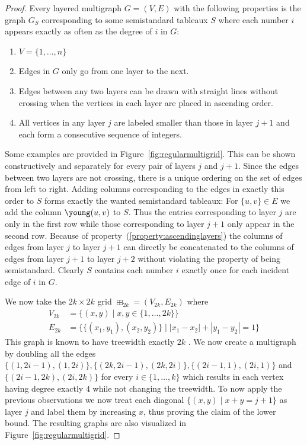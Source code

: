 \documentclass[10pt,a4paper]{article}
\numberwithin{equation}{section}
\theoremstyle{definition}
\begin{document}
\begin{proof}
    Every layered multigraph $G = (V, E)$ with the following properties is the graph $G_S$ corresponding to some semistandard tableaux $S$ where each number $i$ appears exactly as often as the degree of $i$ in $G$:
    \begin{enumerate}
        \item $V = \{1, \ldots, n\}$
        \item Edges in $G$ only go from one layer to the next.
        \item Edges between any two layers can be drawn with straight lines without crossing when the vertices in each layer are placed in ascending order.
        \item All vertices in any layer $j$ are labeled smaller than those in layer $j+1$ and each form a consecutive sequence of integers. \label{property:ascendinglayers}
    \end{enumerate}
    Some examples are provided in Figure~\ref{fig:regularmultigrid}.
    This can be shown constructively and separately for every pair of layers $j$ and $j+1$.
    Since the edges between two layers are not crossing, there is a unique ordering on the set of edges from left to right.
    Adding columns corresponding to the edges in exactly this order to $S$ forms exactly the wanted semistandard tableaux:
    For $\{u, v\} \in E$ we add the column {\scriptsize $\young(u,v)$} to $S$.
    Thus the entries corresponding to layer $j$ are only in the first row while those corresponding to layer $j+1$ only appear in the second row.
    Because of property~(\ref{property:ascendinglayers}) the columns of edges from layer $j$ to layer $j+1$ can directly be concatenated to the columns of edges from layer $j+1$ to layer $j+2$ without violating the property of being semistandard.
    Clearly $S$ contains each number $i$ exactly once for each incident edge of $i$ in $G$.

    We now take the $2k \times 2k$ grid $\boxplus_{2k} = (V_{2k}, E_{2k})$ where
    \begin{align*}
        V_{2k} &= \{(x,y) \mid x, y \in \{1, \ldots, 2k\}\}\\
        E_{2k} &= \{\{(x_1,y_1), (x_2,y_2)\} \mid |x_1 - x_2| + |y_1 - y_2| = 1\}
    \end{align*}
    This graph is known to have treewidth exactly $2k$ \cite{cygan2015parameterized}.
    We now create a multigraph by doubling all the edges $\{(1, 2i-1), (1, 2i)\}, \{(2k, 2i-1), (2k, 2i)\}, \{(2i-1, 1), (2i, 1)\}$ and $\{(2i-1, 2k), (2i, 2k)\}$ for every $i \in \{1, \ldots, k\}$ which results in each vertex having degree exactly $4$ while not changing the treewidth.
    To now apply the previous observations we now treat each diagonal $\{(x,y) \mid x+y = j+1\}$ as layer $j$ and label them by increasing $x$, thus proving the claim of the lower bound.
    The resulting graphs are also visualized in Figure~\ref{fig:regularmultigrid}.
\end{proof}
\end{document}
